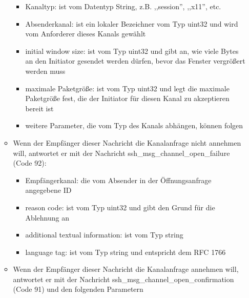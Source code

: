 \documentclass[a4paper]{article}
\begin{document}
\begin{multicols}{3}
\begin{itemize}
\begin{itemize}
                        \begin{itemize}
                            \item
                                  Kanaltyp: ist vom Datentyp String, z.B. ,,session'', ,,x11'', etc.
                            \item
                                  Absenderkanal: ist ein lokaler Bezeichner vom Typ uint32 und wird
                                  vom Anforderer dieses Kanals gewählt
                            \item
                                  initial window size: ist vom Typ uint32 und gibt an, wie viele
                                  Bytes an den Initiator gesendet werden dürfen, bevor das Fenster
                                  vergrößert werden muss
                            \item
                                  maximale Paketgröße: ist vom Typ uint32 und legt die maximale
                                  Paketgröße fest, die der Initiator für diesen Kanal zu akzeptieren
                                  bereit ist
                            \item
                                  weitere Parameter, die vom Typ des Kanals abhängen, können folgen
                        \end{itemize}
                  \item
                        Wenn der Empfänger dieser Nachricht die Kanalanfrage nicht annehmen
                        will, antwortet er mit der Nachricht
                        ssh\_msg\_channel\_open\_failure (Code 92):

                        \begin{itemize}
                            \item
                                  Empfängerkanal: die vom Absender in der Öffnungsanfrage angegebene
                                  ID
                            \item
                                  reason code: ist vom Typ uint32 und gibt den Grund für die
                                  Ablehnung an
                            \item
                                  additional textual information: ist vom Typ string
                            \item
                                  language tag: ist vom Typ string und entspricht dem RFC 1766
                        \end{itemize}
                  \item
                        Wenn der Empfänger dieser Nachricht die Kanalanfrage annehmen will,
                        antwortet er mit der Nachricht ssh\_msg\_channel\_open\_confirmation
                        (Code 91) und den folgenden Parametern


\end{itemize}
\end{itemize}
\end{multicols}
\end{document}
